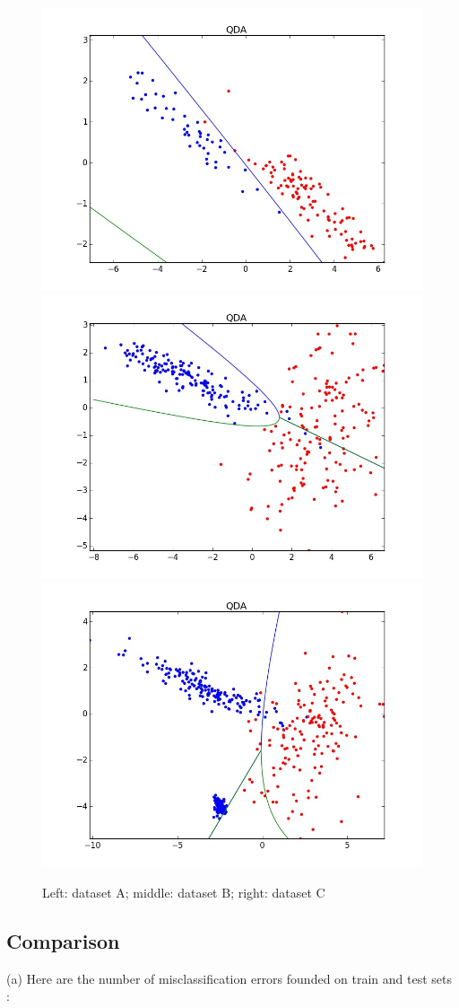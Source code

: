 \documentclass[11pt,a4paper]{article}
\begin{document}
\begin{figure}[H]
\centering
\noindent\includegraphics[scale=0.2]{images/qda_A.jpeg}
\noindent\includegraphics[scale=0.2]{images/qda_B.jpeg}
\noindent\includegraphics[scale=0.2]{images/qda_C.jpeg}
\caption{Left: dataset A; middle: dataset B; right: dataset C}
\end{figure}

\subsection{Comparison}

(a) Here are the number of misclassification errors founded on train and test sets :
\end{document}
